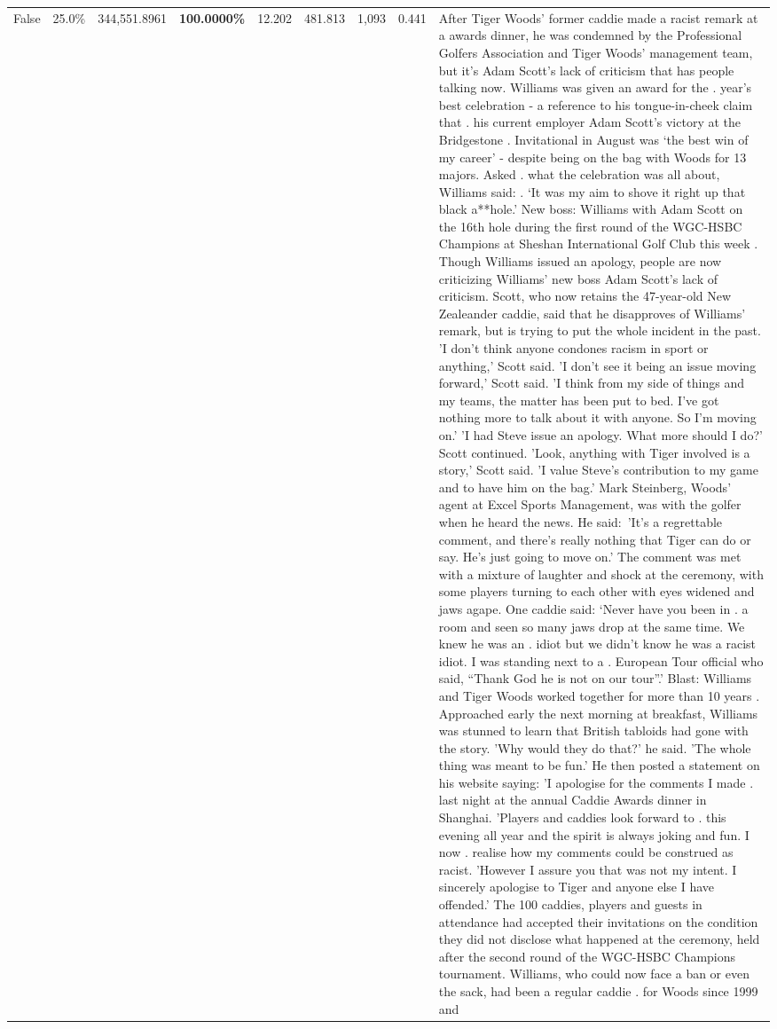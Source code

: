 \begin{table}[H]
\begin{tabular}{lllrlllll}
False & 25.0\% & 344,551.8961 & \bfseries \color{red} 100.0000\% & 12.202 & 481.813 & 1,093 & 0.441 & After Tiger Woods' former caddie made a racist remark at a awards dinner, he was condemned by the Professional Golfers Association and Tiger Woods' management team, but it's Adam Scott's lack of criticism that has people talking now. Williams was given an award for the . year’s best celebration - a reference to his tongue-in-cheek claim that . his current employer Adam Scott’s victory at the Bridgestone . Invitational in August was ‘the best win of my career’ - despite being on the bag with Woods for 13 majors. Asked . what the celebration was all about, Williams said: . ‘It was my aim to shove it right up that black a**hole.’ New boss: Williams with Adam Scott  on the 16th hole during the first round of the WGC-HSBC Champions at Sheshan International Golf Club this week . Though Williams issued an apology, people are now criticizing Williams' new boss Adam Scott's lack of criticism. Scott, who now retains the 47-year-old New Zealeander caddie, said that he disapproves of Williams' remark, but is trying to put the whole incident in the past. 'I don't think anyone condones racism in sport or anything,' Scott said. 'I don't see it being an issue moving forward,' Scott said. 'I think from my side of things and my teams, the matter has been put to bed. I've got nothing more to talk about it with anyone. So I'm moving on.' 'I had Steve issue an apology. What more should I do?' Scott continued. 'Look, anything with Tiger involved is a story,' Scott said. 'I value Steve's contribution to my game and to have him on the bag.' Mark Steinberg, Woods' agent at Excel Sports Management, was with the golfer when he heard the news. He said: 'It's a regrettable comment, and there's really nothing that Tiger can do or say. He's just going to move on.' The comment was met with a mixture of laughter and shock at the ceremony, with some players turning to each other with eyes widened and jaws agape. One caddie said: ‘Never have you been in . a room and seen so many jaws drop at the same time. We knew he was an . idiot but we didn’t know he was a racist idiot. I was standing next to a . European Tour official who said, “Thank God he is not on our tour”.’ Blast: Williams and Tiger Woods worked together for more than 10 years . Approached early the next morning at breakfast, Williams was stunned to learn that British tabloids had gone with the story. 'Why would they do that?' he said. 'The whole thing was meant to be fun.' He then posted a statement on his website saying: 'I apologise for the comments I made . last night at the annual Caddie Awards dinner in Shanghai. 'Players and caddies look forward to . this evening all year and the spirit is always joking and fun. I now . realise how my comments could be construed as racist. 'However I assure you that was not my intent. I sincerely apologise to Tiger and anyone else I have offended.' The 100 caddies, players and guests in attendance had accepted their invitations on the condition they did not disclose what happened at the ceremony, held after the second round of the WGC-HSBC Champions tournament. Williams, who could now face a ban or even the sack, had been a regular caddie . for Woods since 1999 and 
\end{tabular}
\end{table}
